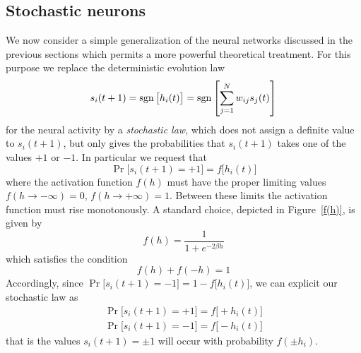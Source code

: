 \subsection{Stochastic neurons}\label{sec:Stochasticneurons}
We now consider a simple generalization of the neural networks discussed in the previous sections which permits a more powerful theoretical treatment.
For this purpose we replace the deterministic evolution law
\begin{equation}\label{DeterministicNetwork}
s_i(t+1)=\operatorname{sgn}{\bigl[h_i(t)\bigr]}=\operatorname{sgn}{\left[\sum_{j=1}^Nw_{ij}s_j(t)\right]}
\end{equation}
for the neural activity by a \emph{stochastic law}, which does not assign a definite value to $s_i(t+1)$, but only gives the probabilities that $s_i(t+1)$ takes one of the values $+1$ or $-1$. In particular we request that
\begin{equation}
\operatorname{Pr}\bigl[s_i(t+1)=+1\bigr]=f\bigl[h_i(t)\bigr]
\end{equation}
where the activation function $f(h)$ must have the proper limiting values $f(h\rightarrow-\infty)=0$, $f(h\rightarrow+\infty)=1$. Between these limits the activation function must rise monotonously. A standard choice, depicted in Figure~\ref{f(h)}, is given by
\begin{equation}\label{sigmoidal}
f(h)=\frac{1}{1+e^{-2\beta h}}
\end{equation}
which satisfies the condition
\begin{equation}
f(h)+f(-h)=1
\end{equation}
Accordingly, since $\operatorname{Pr}\bigl[s_i(t+1)=-1\bigr]=1-f\bigl[h_i(t)\bigr]$, we can explicit our stochastic law as
\begin{gather}
\operatorname{Pr}\bigl[s_i(t+1)=+1\bigr]=f\bigl[+h_i(t)\bigr]\\
\operatorname{Pr}\bigl[s_i(t+1)=-1\bigr]=f\bigl[-h_i(t)\bigr]
\end{gather}
that is the values $s_i(t+1)=\pm1$ will occur with probability $f(\pm h_i)$.

